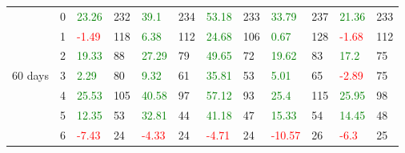 \begin{table}[!htb]
\begin{adjustwidth}{-0.8in}{-0.9in}
\begin{tabular}{|p{4em}|p{2em}|p{3em}|p{3em}|p{3em}|p{3em}|p{3em}|p{3em}|p{3em}|p{3em}|p{3em}|p{3em}|}
            & 0 & \textcolor{green}{23.26} & 232 & \textcolor{green}{39.1} & 234 & \textcolor{green}{53.18} & 233 & \textcolor{green}{33.79} & 237 & \textcolor{green}{21.36} & 233\\\cline{3-12}
            & 1 & \textcolor{red}{-1.49} & 118 & \textcolor{green}{6.38} & 112 & \textcolor{green}{24.68} & 106 & \textcolor{green}{0.67} & 128 & \textcolor{red}{-1.68} & 112\\\cline{3-12}
            & 2 & \textcolor{green}{19.33} & 88 & \textcolor{green}{27.29} & 79 & \textcolor{green}{49.65} & 72 & \textcolor{green}{19.62} & 83 & \textcolor{green}{17.2} & 75\\\cline{3-12}
            60 days & 3 & \textcolor{green}{2.29} & 80 & \textcolor{green}{9.32} & 61 & \textcolor{green}{35.81} & 53 & \textcolor{green}{5.01} & 65 & \textcolor{red}{-2.89} & 75\\\cline{3-12}
            & 4 & \textcolor{green}{25.53} & 105 & \textcolor{green}{40.58} & 97 & \textcolor{green}{57.12} & 93 & \textcolor{green}{25.4} & 115 & \textcolor{green}{25.95} & 98\\\cline{3-12}
            & 5 & \textcolor{green}{12.35} & 53 & \textcolor{green}{32.81} & 44 & \textcolor{green}{41.18} & 47 & \textcolor{green}{15.33} & 54 & \textcolor{green}{14.45} & 48\\\cline{3-12}
            & 6 & \textcolor{red}{-7.43} & 24 & \textcolor{red}{-4.33} & 24 & \textcolor{red}{-4.71} & 24 & \textcolor{red}{-10.57} & 26 & \textcolor{red}{-6.3} & 25\\\hline\hline


\end{tabular}
\end{adjustwidth}
\end{table}
